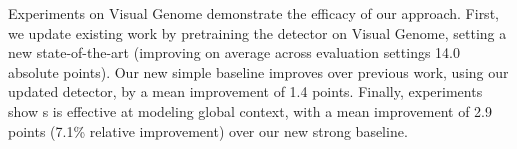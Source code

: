 Experiments on Visual Genome demonstrate the efficacy of our approach. First, we update existing work by pretraining the detector on Visual Genome, setting a new state-of-the-art (improving on average across evaluation settings 14.0 absolute points).
Our new simple baseline improves over previous work, using our updated detector, by a mean improvement of 1.4 points.
Finally, experiments show {\modellong}s is effective at modeling global context, with a mean improvement of 2.9 points (7.1\% relative improvement) over our new strong baseline. 




















































